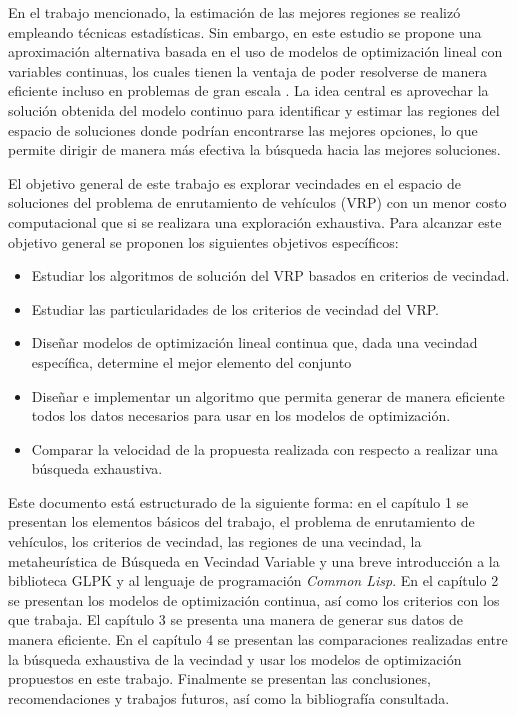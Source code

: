 \documentclass[12pt]{article}
\begin{document}
En el trabajo mencionado, la estimación de las mejores regiones se realizó empleando técnicas estadísticas. Sin embargo, en este estudio se propone una aproximación alternativa basada en el uso de modelos de optimización lineal con variables continuas, los cuales tienen la ventaja de poder resolverse de manera eficiente incluso en problemas de gran escala \cite{ref24}. La idea central es aprovechar la solución obtenida del modelo continuo para identificar y estimar las regiones del espacio de soluciones donde podrían encontrarse las mejores opciones, lo que permite dirigir de manera más efectiva la búsqueda hacia las mejores soluciones.

El objetivo general de este trabajo es explorar vecindades en el espacio de soluciones del problema de enrutamiento de vehículos (VRP) con un menor costo computacional que si se realizara una exploración exhaustiva. Para alcanzar este objetivo general se proponen los siguientes objetivos específicos:
\begin{itemize}
\item
Estudiar los algoritmos de solución del VRP basados en criterios de vecindad.
\item
Estudiar las particularidades de los criterios de vecindad del VRP.

\item
Diseñar modelos de optimización lineal continua que, dada una vecindad específica, determine el mejor elemento del conjunto

\item
Diseñar e implementar un algoritmo que permita generar de manera eficiente todos los datos necesarios para usar en los modelos de optimización.

\item Comparar la velocidad de la propuesta realizada con respecto a realizar una búsqueda exhaustiva.
\end{itemize}



Este documento está estructurado de la siguiente forma: en el capítulo 1 se presentan los elementos básicos del trabajo, el problema de enrutamiento de vehículos, los criterios de vecindad, las regiones de una vecindad, la metaheurística de Búsqueda en Vecindad Variable y una breve introducción a la biblioteca GLPK y al lenguaje de programación \textit{Common Lisp}. En el capítulo 2 se presentan los modelos de optimización continua, así como los criterios con los que trabaja. El capítulo 3 se presenta una manera de generar sus datos de manera eficiente. En el capítulo 4 se presentan las comparaciones realizadas entre la búsqueda exhaustiva de la vecindad y usar los modelos de optimización propuestos en este trabajo. Finalmente se presentan las conclusiones, recomendaciones y trabajos futuros, así como la bibliografía consultada.
\newpage


\end{document}
